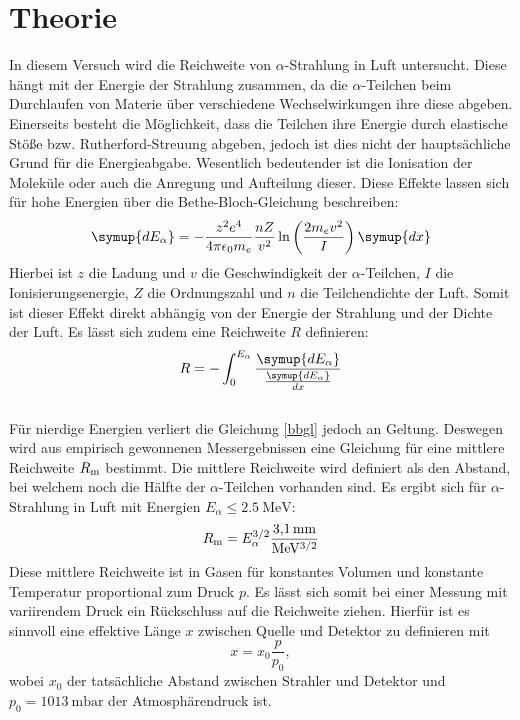 \section{Theorie}
\label{sec:Theorie}
In diesem Versuch wird die Reichweite von $\alpha$-Strahlung in Luft untersucht.
Diese hängt mit der Energie der Strahlung zusammen, da die $\alpha$-Teilchen beim Durchlaufen von Materie über verschiedene Wechselwirkungen ihre diese abgeben.
Einerseits besteht die Möglichkeit, dass die Teilchen ihre Energie durch elastische Stöße bzw. Rutherford-Streuung abgeben, jedoch ist dies nicht der hauptsächliche Grund für die Energieabgabe.
Wesentlich bedeutender ist die Ionisation der Moleküle oder auch die Anregung und Aufteilung dieser. Diese Effekte lassen sich für hohe Energien über die Bethe-Bloch-Gleichung beschreiben:
\begin{equation}
	\label{bbgl}
	\symup{dE_\alpha} = -\frac{z^2e^4}{4\pi\epsilon_0m_e} \frac{nZ}{v^2} \ln\left(\frac{2m_ev^2}{I}\right) \symup{dx}
\end{equation}
Hierbei ist $z$ die Ladung und $v$ die Geschwindigkeit der $\alpha$-Teilchen, $I$ die Ionisierungsenergie, $Z$ die Ordnungszahl und $n$ die Teilchendichte der Luft.
Somit ist dieser Effekt direkt abhängig von der Energie der Strahlung und der Dichte der Luft.
Es lässt sich zudem eine Reichweite $R$ definieren:
\begin{equation}
	\label{R}
	R=-\int_0^{E_\alpha}\frac{\symup{dE_\alpha}}{\frac{\symup{dE_\alpha}}{dx}}
\end{equation}
\\
Für nierdige Energien verliert die Gleichung \eqref{bbgl} jedoch an Geltung. Deswegen wird aus empirisch gewonnenen Messergebnissen eine Gleichung für eine mittlere Reichweite $R_\text m$ bestimmt.
Die mittlere Reichweite wird definiert als den Abstand, bei welchem noch die Hälfte der $\alpha$-Teilchen vorhanden sind.
Es ergibt sich für $\alpha$-Strahlung in Luft mit Energien $E_\alpha \le \SI{2.5}{\mega\electronvolt}$:
\begin{equation}
	\label{Rm}
	R_\text m = E_\alpha^{3/2} \frac{\SI{3.1}{\milli\meter}}{\si{\mega\electronvolt}^{3/2}}
\end{equation}
Diese mittlere Reichweite ist in Gasen für konstantes Volumen und konstante Temperatur proportional zum Druck $p$.
Es lässt sich somit bei einer Messung mit variirendem Druck ein Rückschluss auf die Reichweite ziehen.
Hierfür ist es sinnvoll eine effektive Länge $x$ zwischen Quelle und Detektor zu definieren mit
\begin{equation}
	\label{xeff}
	x = x_0\frac{p}{p_0},
\end{equation}
wobei $x_0$ der tatsächliche Abstand zwischen Strahler und Detektor und $p_0 = \SI{1013}{\milli\bar}$ der Atmosphärendruck ist.
